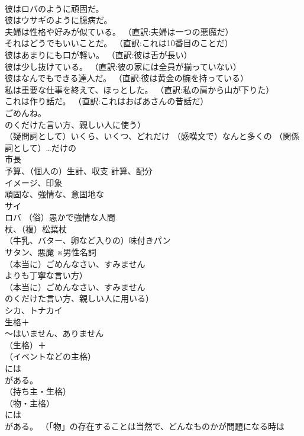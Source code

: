 \documentclass[8pt]{extreport}
\begin{document}
\begin{CJK}{UTF8}{min}
\\	彼はロバのように頑固だ。
\\	彼はウサギのように臆病だ。
\\	夫婦は性格や好みが似ている。 （直訳:夫婦は一つの悪魔だ）
\\	それはどうでもいいことだ。 （直訳:これは10番目のことだ）
\\	彼はあまりにも口が軽い。 （直訳:彼は舌が長い）
\\	彼は少し抜けている。 （直訳:彼の家には全員が揃っていない）
\\	彼はなんでもできる達人だ。 （直訳:彼は黄金の腕を持っている）
\\	私は重要な仕事を終えて、ほっとした。 （直訳:私の肩から山が下りた）
\\	これは作り話だ。 （直訳:これはおばあさんの昔話だ）
\\	ごめんね。 
\\	のくだけた言い方、親しい人に使う）
\\	[不定]（疑問詞として）いくら、いくつ、どれだけ （感嘆文で）なんと多くの （関係詞として）…だけの
\\	市長
\\	予算、（個人の）生計、収支 計算、配分
\\	イメージ、印象
\\	頑固な、強情な、意固地な
\\	サイ
\\	ロバ （俗）愚かで強情な人間
\\	杖、（複）松葉杖
\\	（牛乳、バター、卵など入りの）味付きパン
\\	サタン、悪魔 ※男性名詞
\\	（本当に）ごめんなさい、すみません 
\\	よりも丁寧な言い方）
\\	（本当に）ごめんなさい、すみません
\\	のくだけた言い方、親しい人に用いる）
\\	シカ、トナカイ
\\	生格＋
\\	〜はいません、ありません
\\	（生格）＋
\\	（イベントなどの主格）	
\\	には
\\	がある。
\\	（持ち主・生格） 
\\	（物・主格）	
\\	には
\\	がある。 （「物」の存在することは当然で、どんなものかが問題になる時は

\end{CJK}
\end{document}
